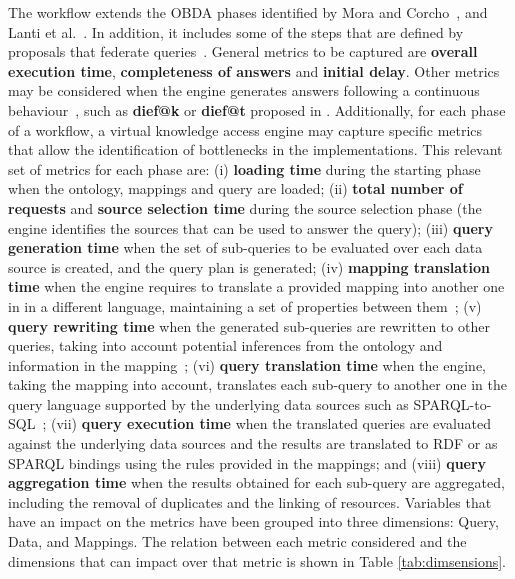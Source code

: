 The workflow extends the OBDA phases identified by Mora and Corcho~\citep{mora2013towards}, and Lanti et al.~\citep{lanti2015npd}. In addition, it includes some of the steps that are defined by proposals that federate queries~\citep{schwarte2011fedx}. General metrics to be captured are \textbf{overall execution time}, \textbf{completeness of answers} and \textbf{initial delay}. Other metrics may be considered when the engine generates answers following a continuous behaviour~\citep{sharaf2008algorithms}, such as \textbf{dief@k} or \textbf{dief@t} proposed in \citep{acosta2017diefficiency}. Additionally, for each phase of a workflow, a virtual knowledge access engine may capture specific metrics that allow the identification of bottlenecks in the implementations. This relevant set of metrics for each phase are: (i) \textbf{loading time} during the starting phase when the ontology, mappings and query are loaded; (ii) \textbf{total number of requests} and  \textbf{source selection time} during the source selection phase (the engine identifies the sources that can be used to answer the query); (iii) \textbf{query generation time} when the set of sub-queries to be evaluated over each data source is created, and the query plan is generated; (iv) \textbf{mapping translation time} when the engine requires to translate a provided mapping into another one in in a different language, maintaining a set of properties between them~\citep{corcho2019towards}; (v) \textbf{query rewriting time} when the generated sub-queries are rewritten to other queries, taking into account potential inferences from the ontology and information in the mapping~\citep{mora2014kyrie2}; (vi) \textbf{query translation time} when the engine, taking the mapping into account, translates each sub-query to another one in the query language supported by the underlying data sources such as SPARQL-to-SQL~\citep{chebotko2009semantics}; (vii) \textbf{query execution time} when the translated queries are evaluated against the underlying data sources and the results are translated to RDF or as SPARQL bindings using the rules provided in the mappings; and (viii) \textbf{query aggregation time} when the results obtained for each sub-query are aggregated, including the removal of duplicates and the linking of resources. Variables that have an impact on the metrics have been grouped into three dimensions: Query, Data, and Mappings. The relation between each  metric considered  and the dimensions that can impact over that metric is  shown in Table \ref{tab:dimsensions}.

